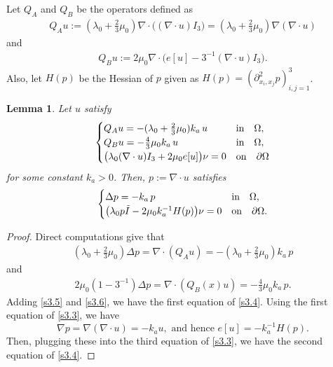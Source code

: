 \documentclass[a4paper,12pt]{article}
\newtheorem{lemma}[Th]{Lemma}
\newtheorem{a priori condition}[Th]{A priori condition}
\begin{document}
Let $Q_A$ and $Q_B$ be the operators defined as
\begin{equation}\label{s3.1}
\begin{aligned}
Q_Au:=(\lambda_0+\frac{2}{3}\mu_0)\nabla\cdot \big((\nabla\cdot u) I_3\big)=(\lambda_0+\frac{2}{3}\mu_0)\nabla (\nabla \cdot u)
\end{aligned}
\end{equation}
and
\begin{equation}\label{s3.2}
\begin{aligned}
Q_Bu:=2\mu_0\nabla\cdot \big(e[u]-3^{-1}(\nabla\cdot u) I_3\big).
\end{aligned}
\end{equation}
Also, let $H(p)$ be the Hessian of $p$ given as $H(p)=(\partial^2_{x_i,x_j}p)_{i,j=1}^3$. 
\begin{lemma}\label{s_lem3.1}
Let $u$ satisfy
\begin{equation}\label{s3.3}
\begin{array}{l}
\begin{cases}
Q_Au=-(\lambda_0+\frac{2}{3}\mu_0)k_a\, u\quad &\mbox{\rm in}\quad \Omega,\\
Q_Bu=-\frac{4}{3}\mu_0k_a\, u\quad &\mbox{\rm in}\quad \Omega,\\
\big(\lambda_0(\nabla \cdot u) I_3+2\mu_0e[u]\big)\nu=0      & {\rm on}\quad \partial\Omega
\end{cases}
\end{array} 
\end{equation}
for some constant $k_a>0$.
Then, $p:=\nabla\cdot u$ satisfies
\begin{equation}\label{s3.4}
\begin{array}{l}
\begin{cases}
\Delta p=-k_a\, p&\mbox{\rm in}\quad \Omega,\\
\big(\lambda_0p\tilde I-2\mu_0k_a^{-1}H(p)\big)\nu=0    & {\rm on}\quad \partial\Omega.
\end{cases}
\end{array}
\end{equation}
\end{lemma}
\begin{proof}
Direct computations give that
\begin{equation}\label{s3.5}
\begin{aligned}
 (\lambda_0+\frac{2}{3}\mu_0)\Delta p=\nabla \cdot (Q_A u)=-(\lambda_0+\frac{2}{3}\mu_0)k_a\, p
\end{aligned}
\end{equation}
and
\begin{equation}\label{s3.6}
\begin{aligned}
 2\mu_0(1-3^{-1})\Delta p=\nabla \cdot (Q_B(x)u)= -\frac{4}{3}\mu_0k_a\, p.
\end{aligned}
\end{equation}
Adding \eqref{s3.5} and \eqref{s3.6}, we have the first equation of \eqref{s3.4}. Using the first equation of \eqref{s3.3}, we have  
$$\nabla p=\nabla (\nabla \cdot u)=-k_au,\,\,\text{and hence}\,\,e[u]=-k_a^{-1}H(p).$$
Then, plugging these into the third equation of \eqref{s3.3}, we have the second equation of \eqref{s3.4}.
\end{proof}
  
\end{document}
